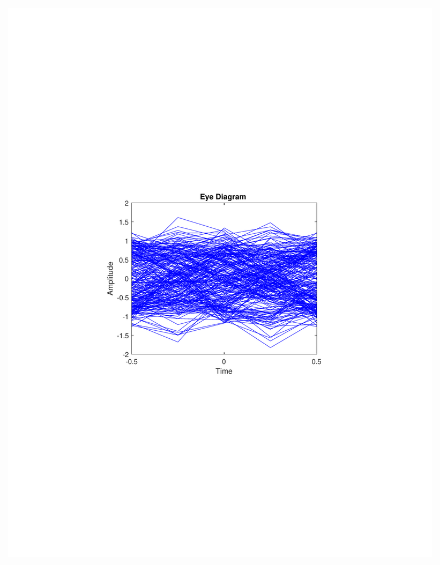 \begin{refsection}
\begin{figure}[H]
\begin{minipage}{0.30\textwidth}
		\includegraphics[clip, trim=4cm 8cm 4cm 8cm, width=1\textwidth]{./sdf/m_qam_system/figures/expResults/intradyne/3_eye_16GBdInSig13dB_AfMIMO1.pdf}
		\label{fig:16GBdSpecMIMO1}
	\end{minipage}
	\begin{minipage}{0.30\textwidth}
		\centering

\end{minipage}
\end{figure}
\end{refsection}
